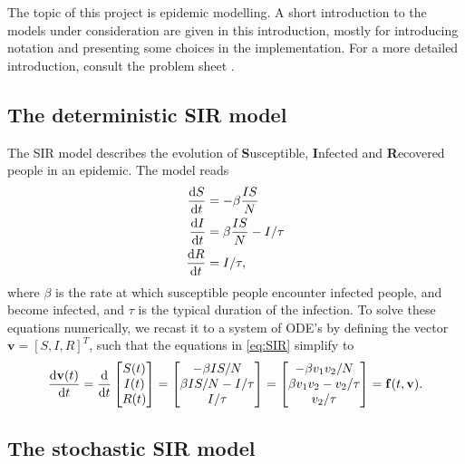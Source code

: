 The topic of this project is epidemic modelling. A short introduction to the models under consideration are given in this introduction, mostly for introducing notation and presenting some choices in the implementation. For a more detailed introduction, consult the problem sheet \cite{sheet}.

\subsection{The deterministic SIR model}
The SIR model describes the evolution of \textbf{S}usceptible, \textbf{I}nfected and \textbf{R}ecovered people in an epidemic. The model reads
\begin{subequations}\label{eq:SIR}
\begin{align}
	\frac{\text{d} S}{\text{d} t} &= - \beta \frac{I S}{N}\\
	\frac{\text{d} I}{\text{d} t} &= \beta \frac{IS }{N} - I/\tau \\
	\frac{\text{d} R}{\text{d} t} &= I/\tau, 
\end{align}
\end{subequations}
where $\beta$ is the rate at which susceptible people encounter infected people, and become infected, and $\tau$ is the typical duration of the infection. To solve these equations numerically, we recast it to a system of ODE's by defining the vector $\mathbf{v} = [S,I,R]^T$, such that the equations in \ref{eq:SIR} simplify to
\begin{equation}\label{eq:sir_vect}
	\frac{\text{d} \mathbf{v}(t)}{\text{d} t} = \frac{\mathrm{d}}{\mathrm{d}t} \begin{bmatrix}
		S(t) \\
		I(t) \\
		R(t)
	\end{bmatrix}
	= \begin{bmatrix}
		- \beta IS/N \\
		\beta  IS/N - I/\tau \\
		I/\tau
	\end{bmatrix} = \begin{bmatrix}
		-\beta v_1 v_2 /N \\
		\beta v_1 v_2 - v_2/\tau \\
		v_2 / \tau
	\end{bmatrix}= \mathbf{f}(t,\mathbf{v}).
\end{equation}

\subsection{The stochastic SIR model}\label{sec:stochsirtheory}

